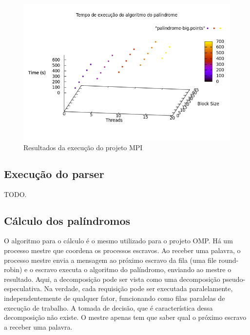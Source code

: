 \documentclass[a4paper]{article}
\begin{document}
\begin{figure}[float=p]
	\includegraphics[scale=0.5]{graph-mpi}
	\caption{Resultados da execução do projeto MPI}
	\label{graph-mpi}
\end{figure}

\subsection{Execução do parser}
\indent \indent TODO.

\subsection{Cálculo dos palíndromos}
\indent \indent O algoritmo para o cálculo é o mesmo utilizado para o projeto OMP. Há um processo mestre que coordena os processos escravos. Ao receber uma palavra, o processo mestre envia a mensagem ao próximo escravo da fila (uma file round-robin) e o escravo executa o algoritmo do palíndromo, enviando ao mestre o resultado. Aqui, a decomposição pode ser vista como uma decomposição pseudo-especulativa. Na verdade, cada requisição pode ser executada paralelamente, independentemente de qualquer fator, funcionando como filas paralelas de execução de trabalho. A tomada de decisão, que é característica dessa decomposição não existe. O mestre apenas tem que saber qual o próximo escravo a receber uma palavra.
\end{document}
